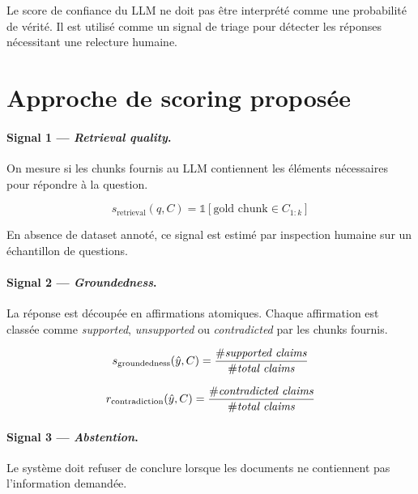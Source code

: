 Le score de confiance du LLM ne doit pas être interprété comme une
probabilité de vérité. Il est utilisé comme un signal de triage pour détecter
les réponses nécessitant une relecture humaine.

\section{Approche de scoring proposée}

\paragraph{Signal 1 --- \textit{Retrieval quality}.}

On mesure si les chunks fournis au LLM contiennent les éléments nécessaires
pour répondre à la question.

\begin{equation}
  s_{\text{retrieval}}(q, C)
  = \mathbb{1}[\text{gold chunk} \in C_{1:k}]
  \label{eq:llm_retrieval}
\end{equation}

En absence de dataset annoté, ce signal est estimé par inspection humaine sur
un échantillon de questions.

\paragraph{Signal 2 --- \textit{Groundedness}.}

La réponse est découpée en affirmations atomiques. Chaque affirmation est
classée comme \textit{supported}, \textit{unsupported} ou \textit{contradicted}
par les chunks fournis.

\begin{equation}
  s_{\text{groundedness}}(\hat{y}, C)
  = \frac{\#\text{\textit{supported claims}}}{\#\text{\textit{total claims}}}
  \label{eq:llm_groundedness}
\end{equation}

\begin{equation}
  r_{\text{contradiction}}(\hat{y}, C)
  = \frac{\#\text{\textit{contradicted claims}}}{\#\text{\textit{total claims}}}
  \label{eq:llm_contradiction}
\end{equation}

\paragraph{Signal 3 --- \textit{Abstention}.}

Le système doit refuser de conclure lorsque les documents ne contiennent pas
l'information demandée.

